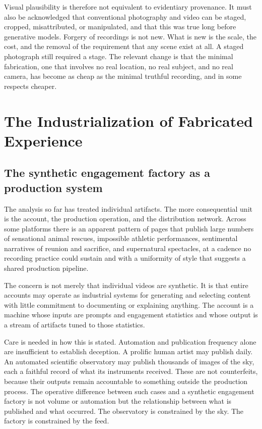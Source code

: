 \documentclass[12pt]{article}
\theoremstyle{plain}
\theoremstyle{definition}
\theoremstyle{remark}
\begin{document}
Visual plausibility is therefore not equivalent to evidentiary provenance. It must also be acknowledged that conventional photography and video can be staged, cropped, misattributed, or manipulated, and that this was true long before generative models. Forgery of recordings is not new. What is new is the scale, the cost, and the removal of the requirement that any scene exist at all. A staged photograph still required a stage. The relevant change is that the minimal fabrication, one that involves no real location, no real subject, and no real camera, has become as cheap as the minimal truthful recording, and in some respects cheaper.

\section{The Industrialization of Fabricated Experience}

\subsection{The synthetic engagement factory as a production system}

The analysis so far has treated individual artifacts. The more consequential unit is the account, the production operation, and the distribution network. Across some platforms there is an apparent pattern of pages that publish large numbers of sensational animal rescues, impossible athletic performances, sentimental narratives of reunion and sacrifice, and supernatural spectacles, at a cadence no recording practice could sustain and with a uniformity of style that suggests a shared production pipeline.

The concern is not merely that individual videos are synthetic. It is that entire accounts may operate as industrial systems for generating and selecting content with little commitment to documenting or explaining anything. The account is a machine whose inputs are prompts and engagement statistics and whose output is a stream of artifacts tuned to those statistics.

Care is needed in how this is stated. Automation and publication frequency alone are insufficient to establish deception. A prolific human artist may publish daily. An automated scientific observatory may publish thousands of images of the sky, each a faithful record of what its instruments received. These are not counterfeits, because their outputs remain accountable to something outside the production process. The operative difference between such cases and a synthetic engagement factory is not volume or automation but the relationship between what is published and what occurred. The observatory is constrained by the sky. The factory is constrained by the feed.
\end{document}
